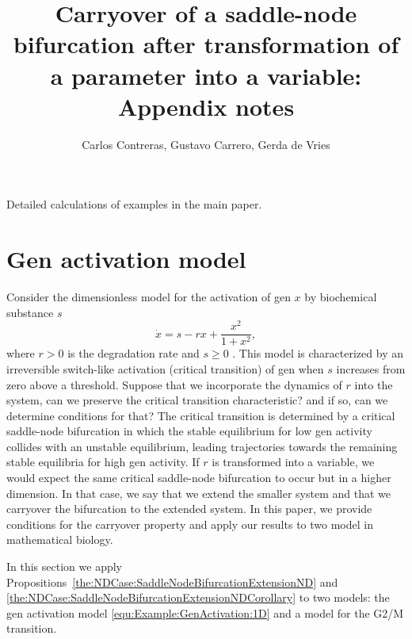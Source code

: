 \documentclass[12pt]{article}
\title{Carryover of a saddle-node bifurcation after transformation of a parameter into a variable: Appendix notes}
\author{Carlos Contreras, Gustavo Carrero, Gerda de Vries}
\begin{document}
\maketitle

Detailed calculations of examples in the main paper.

\section{Gen activation model}

Consider the dimensionless model for the activation of gen $x$ by biochemical substance $s$
\begin{equation}
    \dot x = s - rx + \frac{x^{2}}{1+x^{2}},
    \label{equ:Example:GenActivation:1D}
\end{equation}
where $r>0$ is the degradation rate and $s\geq0$ \citep{Strogatz1994, Lewis1977}. This model is characterized by an irreversible switch-like activation (critical transition) of gen when $s$ increases from zero above a threshold. Suppose that we incorporate the dynamics of $r$ into the system, can we preserve the critical transition characteristic? and if so, can we determine conditions for that? The critical transition is determined by a critical saddle-node bifurcation in which the stable equilibrium for low gen activity collides with an unstable equilibrium, leading trajectories towards the remaining stable equilibria for high gen activity. If $r$ is transformed into a variable, we would expect the same critical saddle-node bifurcation to occur but in a higher dimension. In that case, we say that we extend the smaller system and that we carryover the bifurcation to the extended system. In this paper, we provide conditions for the carryover property and apply our results to two model in mathematical biology.


In this section we apply Propositions~\ref{the:NDCase:SaddleNodeBifurcationExtensionND} and \ref{the:NDCase:SaddleNodeBifurcationExtensionNDCorollary} to two models: the gen activation model \eqref{equ:Example:GenActivation:1D} and a model for the G2/M transition.
\end{document}
